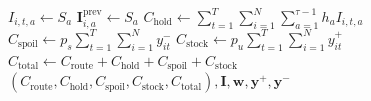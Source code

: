 \documentclass[11pt,a4paper]{article}
\theoremstyle{definition}
\theoremstyle{remark}
\begin{document}
\begin{algorithm}[H]
\begin{algorithmic}[1]
        \EndFor
            \State $I_{i,t,a} \gets S_a$ 
            \State $\mathbf{I}^{\text{prev}}_{i, a} \gets S_a$
        \EndFor
    \EndFor
\EndFor
\State $C_{\text{hold}} \gets \sum_{t=1}^T \sum_{i=1}^N \sum_{a=1}^{\tau-1} h_a I_{i,t,a}$
\State $C_{\text{spoil}} \gets p_s \sum_{t=1}^T \sum_{i=1}^N y_{it}^-$
\State $C_{\text{stock}} \gets p_u \sum_{t=1}^T \sum_{i=1}^N y_{it}^+$
\State $C_{\text{total}} \gets C_{\text{route}} + C_{\text{hold}} + C_{\text{spoil}} + C_{\text{stock}}$
\State \Return $(C_{\text{route}}, C_{\text{hold}}, C_{\text{spoil}}, C_{\text{stock}}, C_{\text{total}}), \mathbf{I}, \mathbf{w}, \mathbf{y}^+, \mathbf{y}^-$
\end{algorithmic}
\end{algorithm}
\end{document}
